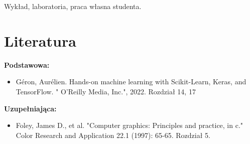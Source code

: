 \documentclass[12pt, a4paper]{article}
\begin{document}
Wykład, laboratoria, praca własna studenta.

\section{Literatura}

\textbf{Podstawowa:}
\begin{itemize}
  \item Géron, Aurélien. Hands-on machine learning with Scikit-Learn, Keras, and TensorFlow. " O'Reilly Media, Inc.", 2022.  Rozdział 14, 17
\end{itemize}

\textbf{Uzupełniająca:}
\begin{itemize}
  \item Foley, James D., et al. "Computer graphics: Principles and practice, in c." Color Research and Application 22.1 (1997): 65-65. Rozdział 5.
\end{itemize}
\end{document}
